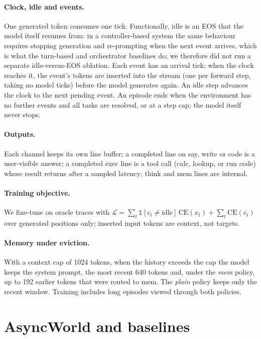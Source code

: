 \documentclass[10pt]{article}
\begin{document}
\paragraph{Clock, idle and events.} One generated token consumes one tick. Functionally, idle is an EOS that the model itself resumes from: in a controller-based system the same behaviour requires stopping generation and re-prompting when the next event arrives, which is what the turn-based and orchestrator baselines do; we therefore did not run a separate idle-versus-EOS ablation. Each event has an arrival tick; when the clock reaches it, the event's tokens are inserted into the stream (one per forward step, taking no model ticks) before the model generates again. An idle step advances the clock to the next pending event. An episode ends when the environment has no further events and all tasks are resolved, or at a step cap; the model itself never stops.

\paragraph{Outputs.} Each channel keeps its own line buffer; a completed line on say, write or code is a user-visible answer; a completed exec line is a tool call (calc, lookup, or run code) whose result returns after a sampled latency; think and mem lines are internal.

\paragraph{Training objective.} We fine-tune on oracle traces with $\mathcal{L}=\sum_t \mathbb{1}[c_t\neq\text{idle}]\,\mathrm{CE}(x_t)+\sum_t \mathrm{CE}(c_t)$ over generated positions only; inserted input tokens are context, not targets.

\paragraph{Memory under eviction.} With a context cap of 1024 tokens, when the history exceeds the cap the model keeps the system prompt, the most recent 640 tokens and, under the \emph{mem} policy, up to 192 earlier tokens that were routed to mem. The \emph{plain} policy keeps only the recent window. Training includes long episodes viewed through both policies.

\section{AsyncWorld and baselines}\label{sec:world}
\end{document}
